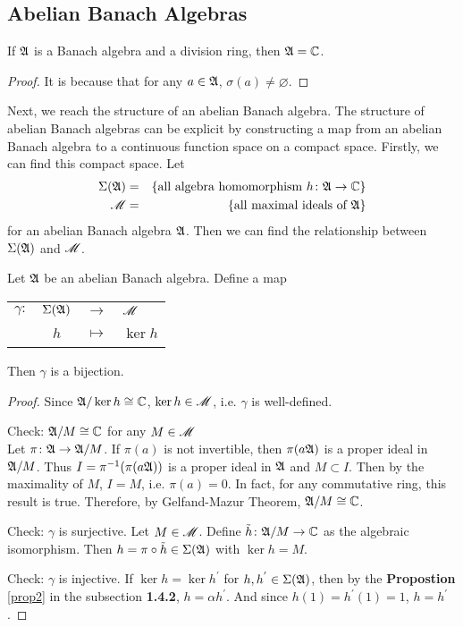 \subsection{Abelian Banach Algebras} \label{sec2}

\begin{thm}
	If $\mathfrak{A}$ is a Banach algebra and a division ring, then $\mathfrak{A} = \mathbb{C}$.
\end{thm}
\begin{proof}
	It is because that for any $a \in \mathfrak{A}$, $\sigma(a) \neq \varnothing$.
\end{proof}

Next, we reach the structure of an abelian Banach algebra. The structure of abelian Banach algebras can be explicit by constructing a map from an abelian Banach algebra to a continuous function space on a compact space. Firstly, we can find this compact space. Let 
\begin{eqnarray*}
	\Sigma(\mathfrak{A}) &=& \{ \text{all algebra homomorphism } h \colon \mathfrak{A} \rightarrow \mathbb{C}\}\\
	\mathscr{M} &=& \{\text{all maximal ideals of } \mathfrak{A}\}
\end{eqnarray*}
for an abelian Banach algebra $\mathfrak{A}$. Then we can find the relationship between $\Sigma(\mathfrak{A})$ and $\mathscr{M}$.

\begin{thm}
	Let $\mathfrak{A}$ be an abelian Banach algebra. Define a map
	\begin{center}
		\begin{tabular}{l c c l}
			$\gamma \colon$ & $\Sigma(\mathfrak{A})$ & $\longrightarrow$ & $\mathscr{M}$ \\
			~ & $h$ & $\longmapsto$ & $\ker{h}$
		\end{tabular}
	\end{center}
	Then $\gamma$ is a bijection.
\end{thm}
\begin{proof}
	Since $\mathfrak{A} / \ker{h} \cong \mathbb{C}$, $\ker{h} \in \mathscr{M}$, i.e. $\gamma$ is well-defined.
	\item Check: $\mathfrak{A} / M \cong \mathbb{C}$ for any $M \in \mathscr{M}$\\
		Let $\pi \colon \mathfrak{A} \rightarrow \mathfrak{A} / M$. If $\pi(a)$ is not invertible, then $\pi(a\mathfrak{A})$ is a proper ideal in $\mathfrak{A} / M$. Thus $I = \pi^{-1}(\pi(a\mathfrak{A}))$ is a proper ideal in $\mathfrak{A}$ and $M \subset I$. Then by the maximality of $M$, $I=M$, i.e. $\pi(a)=0$. In fact, for any commutative ring, this result is true. Therefore, by Gelfand-Mazur Theorem, $\mathfrak{A} / M \cong \mathbb{C}$.
	\item Check: $\gamma$ is surjective.
		Let $M \in \mathscr{M}$. Define $\tilde{h} \colon \mathfrak{A} / M \rightarrow \mathbb{C}$ as the algebraic isomorphism. Then $h=\pi \circ \tilde{h} \in \Sigma(\mathfrak{A})$ with $\ker{h} = M$.
	\item Check: $\gamma$ is injective.
		If $\ker{h} = \ker{h^{'}}$ for $h,h^{'} \in \Sigma(\mathfrak{A})$, then by the \textbf{Propostion} \ref{prop2} in the subsection \textbf{1.4.2}, $h = \alpha h^{'}$. And since $h(1) = h^{'}(1)=1$, $h=h^{'}$.
\end{proof}

